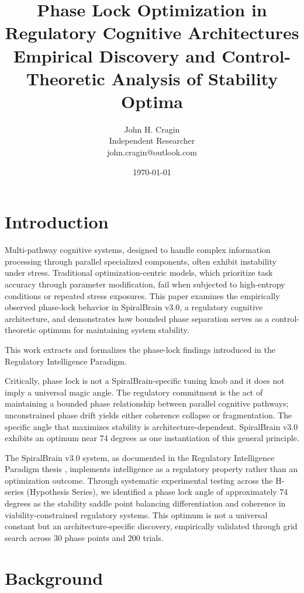 \documentclass[12pt,a4paper]{report}
\title{Phase Lock Optimization in Regulatory Cognitive Architectures\\
\large Empirical Discovery and Control-Theoretic Analysis of Stability Optima}
\author{John H. Cragin \\
Independent Researcher \\
john.cragin@outlook.com}
\date{\today}
\begin{document}
\maketitle

\section{Introduction}

Multi-pathway cognitive systems, designed to handle complex information processing through parallel specialized components, often exhibit instability under stress. Traditional optimization-centric models, which prioritize task accuracy through parameter modification, fail when subjected to high-entropy conditions or repeated stress exposures. This paper examines the empirically observed phase-lock behavior in SpiralBrain v3.0, a regulatory cognitive architecture, and demonstrates how bounded phase separation serves as a control-theoretic optimum for maintaining system stability.

This work extracts and formalizes the phase-lock findings introduced in the Regulatory Intelligence Paradigm.

Critically, phase lock is not a SpiralBrain-specific tuning knob and it does not imply a universal magic angle. The regulatory commitment is the act of maintaining a bounded phase relationship between parallel cognitive pathways; unconstrained phase drift yields either coherence collapse or fragmentation. The specific angle that maximizes stability is architecture-dependent. SpiralBrain v3.0 exhibits an optimum near 74 degrees as one instantiation of this general principle.

The SpiralBrain v3.0 system, as documented in the Regulatory Intelligence Paradigm thesis \cite{Cragin2026Thesis}, implements intelligence as a regulatory property rather than an optimization outcome. Through systematic experimental testing across the H-series (Hypothesis Series), we identified a phase lock angle of approximately 74 degrees as the stability saddle point balancing differentiation and coherence in viability-constrained regulatory systems. This optimum is not a universal constant but an architecture-specific discovery, empirically validated through grid search across 30 phase points and 200 trials.

\section{Background}
\end{document}
